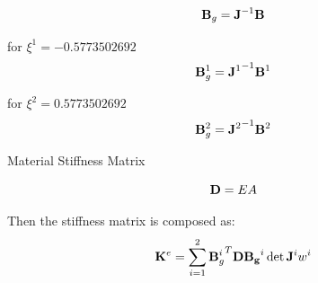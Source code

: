 \begin{equation}
    \mathbf{B}_g
    = \mathbf{J}^{-1} \mathbf{B}
\end{equation}

for $ \xi^1 = -0.5773502692 $
\begin{equation}
    \mathbf{B}^1_g
    = {\mathbf{J}^1}^{-1} \mathbf{B}^1
\end{equation}

for $ \xi^2 = 0.5773502692 $
\begin{equation}
    \mathbf{B}^2_g
    = {\mathbf{J}^2}^{-1} \mathbf{B}^2
\end{equation}

Material Stiffness Matrix

\begin{equation}
    \mathbf{D} = EA
\end{equation}

Then the stiffness matrix is composed as:
\begin{equation}
    \mathbf{K}^e = \sum_{i=1}^2 {\mathbf{B}_g^i}^T \mathbf{D} \mathbf{B_g}^i \det \mathbf{J}^i w^i
\end{equation}



